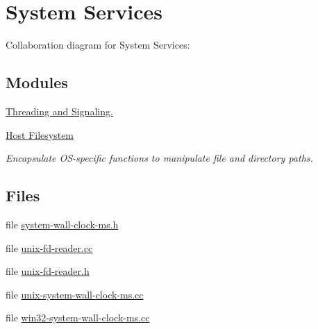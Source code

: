 \hypertarget{group__system}{}\section{System Services}
\label{group__system}
Collaboration diagram for System Services\+:
\subsection*{Modules}
\begin{DoxyCompactItemize}
\item 
\hyperlink{group__thread}{Threading and Signaling.}
\item 
\hyperlink{group__systempath}{Host Filesystem}
\begin{DoxyCompactList}\small\item\em Encapsulate O\+S-\/specific functions to manipulate file and directory paths. \end{DoxyCompactList}\end{DoxyCompactItemize}
\subsection*{Files}
\begin{DoxyCompactItemize}
\item 
file \hyperlink{system-wall-clock-ms_8h}{system-\/wall-\/clock-\/ms.\+h}
\item 
file \hyperlink{unix-fd-reader_8cc}{unix-\/fd-\/reader.\+cc}
\item 
file \hyperlink{unix-fd-reader_8h}{unix-\/fd-\/reader.\+h}
\item 
file \hyperlink{unix-system-wall-clock-ms_8cc}{unix-\/system-\/wall-\/clock-\/ms.\+cc}
\item 
file \hyperlink{win32-system-wall-clock-ms_8cc}{win32-\/system-\/wall-\/clock-\/ms.\+cc}
\end{DoxyCompactItemize}
